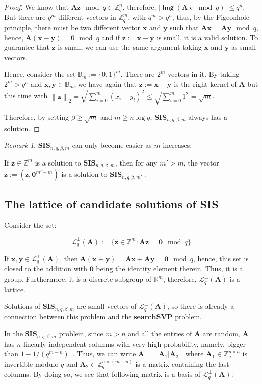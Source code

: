 \documentclass[a4paper,11pt]{article}
\let\vec\mathbf %
\newcommand\Zq{{\mathbb Z}_q}
\newcommand\Zqn{{\mathbb Z}_q^n}
\newcommand\Zqm{{\mathbb Z}_q^m}
\newcommand\Zm{{\mathbb Z}^m}
\newcommand\A{{\mathbf A}}
\newcommand\LqA{\mathcal{L}_q^{\bot}\left(\A\right)}
\newcommand\SIS{\textbf{SIS}_{n, q, \beta, m}}
\newcommand\SVP{\textbf{searchSVP}}
\DeclareMathOperator{\img}{\textsf{Img}}
\newcommand{\norm}[1]{\left\lVert #1 \right\rVert_2}
\theoremstyle{definition}
\theoremstyle{remark}
\newtheorem*{remark}{Remark}
\begin{document}
\begin{proof}
We know that $\A \vec z \mod q \in \Zqn$, therefore, $|\img(\A \star \mod q)|
\le q^n$. But there are $q^m$ different vectors in $\Zqm$, with $q^m > q^n$,
thus, by the Pigeonhole principle, there must be two different vector $\vec x$
and $\vec y$ such that $\A \vec x = \A \vec y \mod q$, hence, $\A (\vec{x - y})
= 0 \mod q$ and if $\vec z := \vec{x - y}$ is small, it is a valid solution. To
guarantee that $\vec z$ is small, we can use the same argument taking $\vec x$
and $\vec y$ as small vectors.

Hence, consider the set $\mathbb{B}_m := \{0, 1\}^m$. There are $2^m$ vectors
in it. By taking $2^m > q^n$ and $\vec x, \vec y \in \mathbb{B}_m$, we have
again that $\vec z := \vec{x - y}$ is the right kernel of $\A$ but this time
with $\norm{\vec z} = \sqrt{\sum_{i=0}^{m} (x_i - y_i)^2} \le
\sqrt{\sum_{i=0}^{m} 1^2} = \sqrt{m}$.

Therefore, by setting $\beta \ge \sqrt{m}$ and $m \ge n\log q$, $\SIS$ always 
has a solution.
\end{proof}


\begin{remark}
$\SIS$  can only become easier as $m$ increases.
\end{remark}

If $\vec z \in \Zm$ is a solution to $\SIS$, then for any $m' > m$, the vector
$\vec z := (\vec z , \vec 0^{m' - m})$ is a solution to \textbf{SIS}$_{n, q,
\beta, m'}~$.


\subsection{The lattice of candidate solutions of SIS}

Consider the set:

$$ \LqA := \{ \vec z \in \Zm : \A \vec z = \vec 0 \mod q \}$$

If $\vec x, \vec y \in \LqA$, then $\A(\vec x + \vec y) = \A\vec x + \A\vec y =
\vec 0 \mod q$, hence, this set is closed to the addition with $\vec 0$ being
the identity element therein. Thus, it is a group. Furthermore, it is a
discrete subgroup of $\mathbb{R}^m$, therefore, $\LqA$ is a lattice.

Solutions of $\SIS$ are small vectors of $\LqA$, so there is already a 
connection between this problem and the $\SVP$ problem.

In the $\SIS$ problem, since $m > n$ and all the entries of $\A$ are random, 
$\A$
has $n$ linearly independent columns with very high probability, namely, bigger
than $1 - 1/(q^{m-n})$~\cite{Kudo16}. Thus, we can write $\A = [\A_1 | \A_2]$
where $\A_1 \in \Zq^{n\times n}$ is invertible modulo $q$ and $\A_2 \in
\Zq^{n\times (m-n)}$ is a matrix containing the last columns. By doing so, we
see that following matrix is a basis of $\LqA$:
\end{document}
